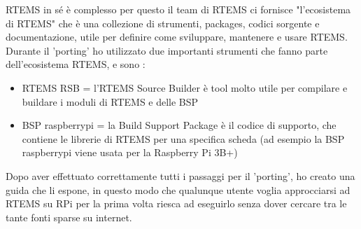 \documentclass[12pt, a4paper, titlepage, oneside]{book}
\begin{document}
\begin{flushleft}
RTEMS in sé è complesso per questo il team di RTEMS ci fornisce "l'ecosistema di RTEMS" che è una collezione di strumenti, packages, codici sorgente e documentazione, utile per definire come sviluppare, mantenere e usare RTEMS.\\
Durante il 'porting' ho utilizzato due importanti strumenti che fanno parte dell'ecosistema RTEMS, e sono :
\begin{itemize}
    \item RTEMS RSB = l'RTEMS Source Builder è tool molto utile per compilare e buildare i moduli di RTEMS e delle BSP 
    \item BSP  raspberrypi = la Build Support Package è il codice di supporto, che contiene le librerie di RTEMS per una specifica scheda (ad esempio la BSP raspberrypi viene usata per la Raspberry Pi 3B+)
\end{itemize}
Dopo aver effettuato correttamente tutti i passaggi per il 'porting', ho creato una guida che li espone, in questo modo che qualunque utente voglia approcciarsi ad RTEMS su RPi per la prima volta riesca ad eseguirlo senza dover cercare tra le tante fonti sparse su internet.


\end{flushleft}
\end{document}
